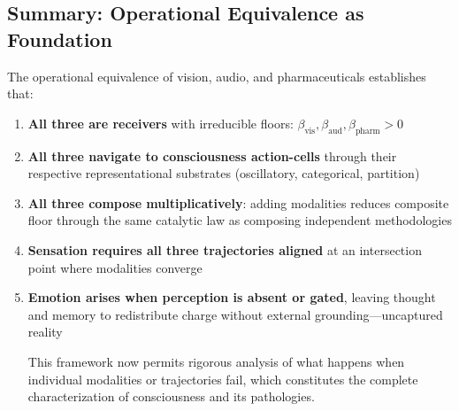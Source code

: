 \subsection{Summary: Operational Equivalence as Foundation}

The operational equivalence of vision, audio, and pharmaceuticals establishes that:

\begin{enumerate}[leftmargin=1.3em]
\item \textbf{All three are receivers} with irreducible floors: $\beta_{\text{vis}}, \beta_{\text{aud}}, \beta_{\text{pharm}} > 0$

\item \textbf{All three navigate to consciousness action-cells} through their respective representational substrates (oscillatory, categorical, partition)

\item \textbf{All three compose multiplicatively}: adding modalities reduces composite floor through the same catalytic law as composing independent methodologies

\item \textbf{Sensation requires all three trajectories aligned} at an intersection point where modalities converge

\item \textbf{Emotion arises when perception is absent or gated}, leaving thought and memory to redistribute charge without external grounding—uncaptured reality

This framework now permits rigorous analysis of what happens when individual modalities or trajectories fail, which constitutes the complete characterization of consciousness and its pathologies.
\end{enumerate}
